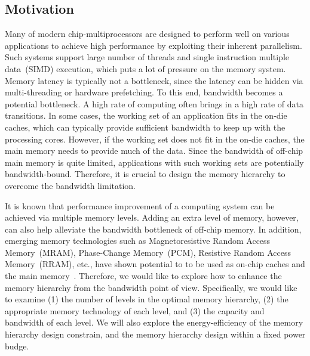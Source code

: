 \documentclass[10pt,letterpaper,singlecolumn]{article}
\begin{document}
\begin{large}

\section{Motivation}

Many of modern chip-multiprocessors are designed to perform well on various
applications to achieve high performance by exploiting their inherent
parallelism. Such systems support large number of threads and single instruction
multiple data~(SIMD) execution, which puts a lot of pressure on the memory
system. Memory latency is typically not a bottleneck, since the latency can be
hidden via multi-threading or hardware prefetching. To this end, bandwidth becomes a
potential bottleneck. A high rate of computing often brings in a high rate of
data transitions. In some cases, the working set of an application fits in the
on-die caches, which can typically provide sufficient bandwidth to keep up with
the processing cores. However, if the working set does not fit in the on-die
caches, the main memory needs to provide much of the data. Since the bandwidth
of off-chip main memory is quite limited, applications with such working sets
are potentially bandwidth-bound. Therefore, it is crucial to design the memory
hierarchy to overcome the bandwidth limitation. 

It is known that performance improvement of a computing system can be achieved
via multiple memory levels. Adding an extra level of memory, however, can also
help alleviate the bandwidth bottleneck of off-chip memory. In addition,
emerging memory technologies such as Magnetoresistive Random Access
Memory~(MRAM), Phase-Change Memory~(PCM), Resistive Random Access Memory~(RRAM),
etc., have shown potential to to be used as on-chip caches and the main
memory~\cite{Sun:2009:MRAM-L2-CMP}. Therefore, we would like to explore how to
enhance the memory hierarchy from the bandwidth point of view. Specifically, we
would like to examine (1) the number of levels in the optimal memory hierarchy,
(2) the appropriate memory technology of each level, and (3) the capacity and
bandwidth of each level. We will also explore the energy-efficiency of the
memory hierarchy design constrain, and the memory hierarchy design within a
fixed power budge.\vspace{0.15in}



\end{large}
\end{document}
